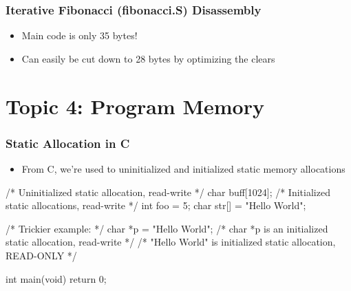 \documentclass[11pt,xcolor=dvipsnames]{beamer}
\newcommand{\vs}{\vspace{0.5em}}
\newcommand{\mvs}{\vspace{-0.95em}}
\begin{document}
\begin{frame}[fragile,t]
\frametitle{Iterative Fibonacci (fibonacci.S) Disassembly}
\mvs
{}
\begin{itemize}
  \item Main code is only 35 bytes!
  \item Can easily be cut down to 28 bytes by optimizing the clears
\end{itemize}
\end{frame}

\section{Topic 4: Program Memory}

\begin{frame}[fragile,t]
\frametitle{Static Allocation in C}
\begin{itemize}
  \item From C, we're used to uninitialized and initialized static memory allocations
\end{itemize}
\vs
\begin{ccode}
/* Uninitialized static allocation, read-write */
char buff[1024];
/* Initialized static allocations, read-write */
int foo = 5;
char str[] = "Hello World";
\end{ccode}
\pause
\begin{ccode}

/* Trickier example: */
char *p = "Hello World";
/* char *p is an initialized static allocation, read-write */
/* "Hello World" is initialized static allocation, READ-ONLY */

int main(void) {
  return 0;
}
\end{ccode}
\end{frame}
\end{document}
